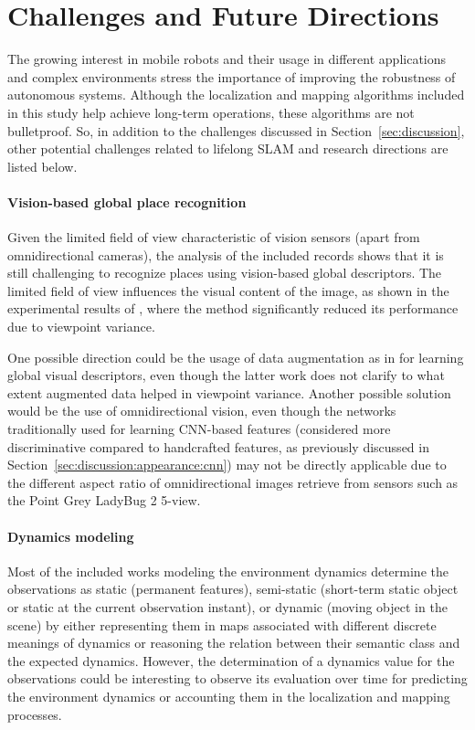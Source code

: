 \section{Challenges and Future Directions}
\label{sec:future}

The growing interest in mobile robots and their usage in different applications and complex environments stress the importance of improving the robustness of autonomous systems. Although the localization and mapping algorithms included in this study help achieve long-term operations, these algorithms are not bulletproof.
So, in addition to the challenges discussed in Section~\ref{sec:discussion}, other potential challenges related to lifelong SLAM and research directions are listed below.



\paragraph{Vision-based global place recognition}

Given the limited field of view characteristic of vision sensors (apart from omnidirectional cameras), the analysis of the included records shows that it is still challenging to recognize places using vision-based global descriptors.
The limited field of view influences the visual content of the image, as shown in the experimental results of \cite{qin-et-al:2020:103561}, where the method significantly reduced its performance due to viewpoint variance.

One possible direction could be the usage of data augmentation as in \cite{tang-et-al:2021:17298814211037497} for learning global visual descriptors, even though the latter work does not clarify to what extent augmented data helped in viewpoint variance.
Another possible solution would be the use of omnidirectional vision, even though the networks traditionally used for learning CNN-based features (considered more discriminative compared to handcrafted features, as previously discussed in Section~\ref{sec:discussion:appearance:cnn}) may not be directly applicable due to the different aspect ratio of omnidirectional images retrieve from sensors such as the Point Grey LadyBug 2 5-view.



\paragraph{Dynamics modeling}

Most of the included works modeling the environment dynamics determine the observations as static (permanent features), semi-static (short-term static object or static at the current observation instant), or dynamic (moving object in the scene) by either representing them in maps associated with different discrete meanings of dynamics or reasoning the relation between their semantic class and the expected dynamics. However, the determination of a dynamics value for the observations could be interesting to observe its evaluation over time for predicting the environment dynamics or accounting them in the localization and mapping processes.

